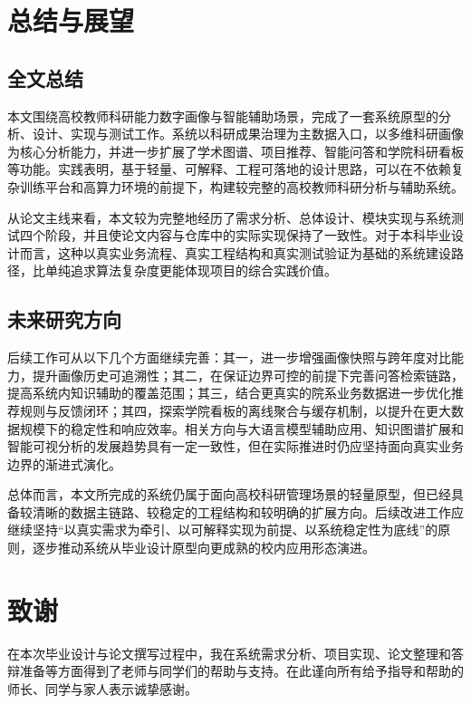 \documentclass[12pt,a4paper]{ctexbook}
\begin{document}
\chapter{总结与展望}
\section{全文总结}
本文围绕高校教师科研能力数字画像与智能辅助场景，完成了一套系统原型的分析、设计、实现与测试工作。系统以科研成果治理为主数据入口，以多维科研画像为核心分析能力，并进一步扩展了学术图谱、项目推荐、智能问答和学院科研看板等功能。实践表明，基于轻量、可解释、工程可落地的设计思路，可以在不依赖复杂训练平台和高算力环境的前提下，构建较完整的高校教师科研分析与辅助系统。

从论文主线来看，本文较为完整地经历了需求分析、总体设计、模块实现与系统测试四个阶段，并且使论文内容与仓库中的实际实现保持了一致性。对于本科毕业设计而言，这种以真实业务流程、真实工程结构和真实测试验证为基础的系统建设路径，比单纯追求算法复杂度更能体现项目的综合实践价值。

\section{未来研究方向}
后续工作可从以下几个方面继续完善：其一，进一步增强画像快照与跨年度对比能力，提升画像历史可追溯性；其二，在保证边界可控的前提下完善问答检索链路，提高系统内知识辅助的覆盖范围；其三，结合更真实的院系业务数据进一步优化推荐规则与反馈闭环；其四，探索学院看板的离线聚合与缓存机制，以提升在更大数据规模下的稳定性和响应效率。相关方向与大语言模型辅助应用、知识图谱扩展和智能可视分析的发展趋势具有一定一致性，但在实际推进时仍应坚持面向真实业务边界的渐进式演化\cite{llm_survey_2023}\cite{kg_survey_foreign_2021}\cite{intelligent_visual_analytics_2024}。

总体而言，本文所完成的系统仍属于面向高校科研管理场景的轻量原型，但已经具备较清晰的数据主链路、较稳定的工程结构和较明确的扩展方向。后续改进工作应继续坚持“以真实需求为牵引、以可解释实现为前提、以系统稳定性为底线”的原则，逐步推动系统从毕业设计原型向更成熟的校内应用形态演进。

\printbibliography[title={参考文献}]

\chapter*{致谢}
在本次毕业设计与论文撰写过程中，我在系统需求分析、项目实现、论文整理和答辩准备等方面得到了老师与同学们的帮助与支持。在此谨向所有给予指导和帮助的师长、同学与家人表示诚挚感谢。
\end{document}
